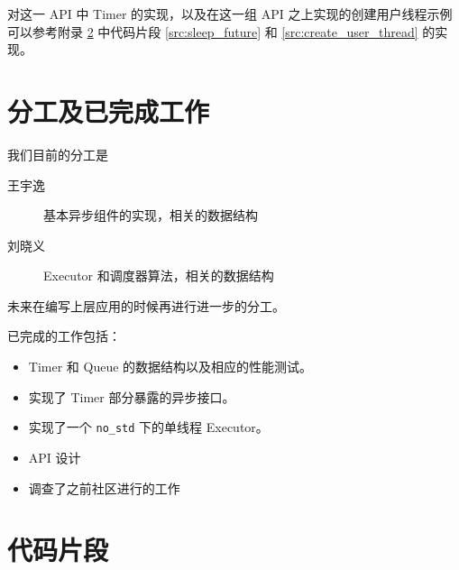 \documentclass[UTF-8]{ctexart}
\begin{document}
  对这一 API 中 Timer 的实现，以及在这一组 API 之上实现的创建用户线程示例可以参考附录 \ref{sec:code} 中代码片段 \ref{src:sleep_future} 和 \ref{src:create_user_thread} 的实现。

  \section{分工及已完成工作}
  我们目前的分工是
  \begin{description}
    \item[王宇逸] 基本异步组件的实现，相关的数据结构
    \item[刘晓义] Executor 和调度器算法，相关的数据结构
  \end{description}

  未来在编写上层应用的时候再进行进一步的分工。

  \vspace{2em}

  已完成的工作包括：
  \begin{itemize}
    \item Timer 和 Queue 的数据结构以及相应的性能测试。
    \item 实现了 Timer 部分暴露的异步接口。
    \item 实现了一个 \texttt{no\_std} 下的单线程 Executor。
    \item API 设计
    \item 调查了之前社区进行的工作
  \end{itemize}

  \pagebreak

  \appendix
  \section{代码片段}
  \label{sec:code}
\end{document}
